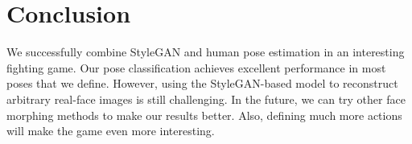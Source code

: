 \section{Conclusion}
We successfully combine StyleGAN and human pose estimation in an interesting fighting game. Our pose classification achieves excellent performance in most poses that we define. However, using the StyleGAN-based model to reconstruct arbitrary real-face images is still challenging. In the future, we can try other face morphing methods to make our results better. Also, defining much more actions will make the game even more interesting.